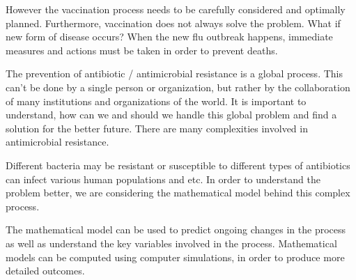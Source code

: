 However the vaccination process needs to be carefully considered and optimally planned. Furthermore, vaccination does not always solve the problem. What if new form of disease occurs? When the new flu outbreak happens, immediate measures and actions must be taken in order to prevent deaths.

The prevention of antibiotic / antimicrobial resistance is a global process. This can’t be done by a single person or organization, but rather by the collaboration of many institutions and organizations of the world. It is important to understand, how can we and should we handle this global problem and find a solution for the better future. There are many complexities involved in antimicrobial resistance.

Different bacteria may be resistant or susceptible to different types of antibiotics can infect various human populations and etc. In order to understand the problem better, we are considering the mathematical model behind this complex process.

The mathematical model can be used to predict ongoing changes in the process as well as understand the key variables involved in the process. Mathematical models can be computed using computer simulations, in order to produce more detailed outcomes.


